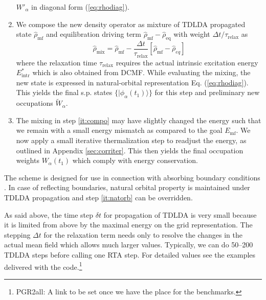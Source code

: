 \documentclass[final,1p]{elsarticle}
\newcommand{\PGRfoot}[1]{{\color{blue}\footnote{\color{blue} #1}}}
\begin{document}
\begin{enumerate}
     $W'_\alpha$ in diagonal form (\ref{eq:rhodiag}).
   \item \label{it:compo} We compose the new density operator as mixture
     of TDLDA propagated state $\hat{\rho}_\mathrm{mf}$ and
     equilibration driving term
     $\hat{\rho}_\mathrm{mf}-\hat{\rho}_\mathrm{eq}$ with
     weight $\Delta t/\tau_\mathrm{relax}$ as
     \begin{equation*}
        \hat{\rho}_\mathrm{mix}
        = 
        \hat{\rho}_\mathrm{mf} -
        \frac{\Delta t}{\tau_\mathrm{relax}}
        \left[\hat{\rho}_\mathrm{mf}-\hat{\rho}_{eq}\right]
     \end{equation*}
     where the relaxation time $\tau_\mathrm{relax}$ requires the
     actual intrinsic excitation energy $E^*_\mathrm{intr}$ which is
     also obtained from DCMF.
     While evaluating the mixing, the new state is
     expressed in natural-orbital representation
     Eq. (\ref{eq:rhodiag}).  This yields the final s.p. states
     $\{|\phi_\alpha(t_1)\rangle\}$ for this step and
     preliminary new occupations $\tilde{W}_\alpha$.
   \item \label{it:therm} 
     The mixing in step \ref{it:compo} may have slightly changed
     the energy such that we remain with a small energy mismatch as
     compared to the goal $E_\mathrm{mf}$.  We now apply a small
     iterative thermalization step to readjust the energy, as outlined
     in Appendix \ref{sec:corriter}. This then yields the final
     occupation weights $W_\alpha(t_1)$ which comply with
     energy conservation.
\end{enumerate}
The scheme is designed for use in connection with absorbing boundary
conditions \cite{Cal00,Rei06c}. 
In case of reflecting boundaries, natural orbital property is
maintained under TDLDA propagation and step \ref{it:natorb}
can be overridden.

As said above, the time step $\delta t$ for propagation of TDLDA is
very small because it is limited from above by the maximal energy on
the grid representation.  The stepping $\Delta t$ for the relaxation
term needs only to resolve the changes in the actual mean field which
allows much larger values.  Typically, we can do 50--200 TDLDA steps
before calling one RTA step. For detailed values see the examples
delivered with the code.\PGRfoot{PGR2all: A link to be set once we
have the place for the benchmarks.}
\end{document}
